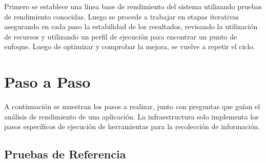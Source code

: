 \documentclass[a4paper]{report}
\begin{document}
Primero se establece una línea base de rendimiento del sistema utilizando pruebas de rendimiento conocidas.
Luego se procede a trabajar en etapas iterativas asegurando en cada paso la estabilidad de los resultados, revisando la utilización de recursos y utilizando un perfil de ejecución para encontrar un punto de enfoque. Luego de optimizar y comprobar la mejora, se vuelve a repetir el ciclo.

\section{Paso a Paso}

A continuación se muestran los pasos a realizar, junto con preguntas que guían el análisis de rendimiento de una aplicación.
La infraestructura solo implementa los pasos específicos de ejecución de herramientas para la recolección de información.

\subsection{Pruebas de Referencia}
\end{document}
